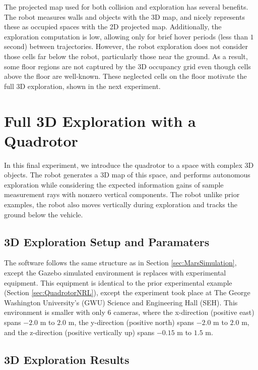 The projected map used for both collision and exploration has several benefits. The robot measures walls and objects with the 3D map, and nicely represents these as occupied spaces with the 2D projected map. Additionally, the exploration computation is low, allowing only for brief hover periods (less than $1$ second) between trajectories. However, the robot exploration does not consider those cells far below the robot, particularly those near the ground. As a result, some floor regions are not captured by the 3D occupancy grid even though cells above the floor are well-known. These neglected cells on the floor motivate the full 3D exploration, shown in the next experiment.



\section{Full 3D Exploration with a Quadrotor}
\label{sec:QuadrotorSEH}

In this final experiment, we introduce the quadrotor to a space with complex 3D objects. The robot generates a 3D map of this space, and performs autonomous exploration while considering the expected information gains of sample measurement rays with nonzero vertical components. The robot unlike prior examples, the robot also moves vertically during exploration and tracks the ground below the vehicle.

\subsection{3D Exploration Setup and Paramaters}
The software follows the same structure as in Section \ref{sec:MarsSimulation}, except the Gazebo simulated environment is replaces with experimental equipment. This equipment is identical to the prior experimental example (Section \ref{sec:QuadrotorNRL}), except the experiment took place at The George Washington University's (GWU) Science and Engineering Hall (SEH). This environment is smaller with only $6$ cameras, where the x-direction (positive east) spans $-2.0$ m to $2.0$ m, the y-direction (positive north) spans $-2.0$ m to $2.0$ m, and the z-direction (positive vertically up) spans $-0.15$ m to $1.5$ m.


\subsection{3D Exploration Results}




